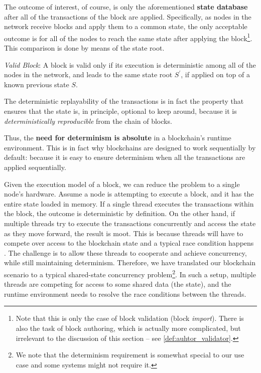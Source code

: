 The outcome of interest, of course, is only the aforementioned \textbf{state database} after all of
the transactions of the block are applied. Specifically, as nodes in the network receive blocks and
apply them to a common state, the only acceptable outcome is for all of the nodes to reach the same
state after applying the block\footnote{Note that this is only the case of block validation (block
\textit{import}). There is also the task of block authoring, which is actually more complicated, but
irrelevant to the discussion of this section -- see \ref{def:auhtor_validator}.}. This comparison is
done by means of the state root.

\begin{definition} \label{def:valid_block} \textit{Valid Block}: A block is valid only if its
	execution is deterministic among all of the nodes in the network, and leads to the same state
	root $S^{'}$, if applied on top of a known previous state $S$.
\end{definition}

\begin{remark}
	The deterministic replayability of the transactions is in fact the property that ensures that
	the state is, in principle, optional to keep around, because it is \textit{deterministically
	reproducible} from the chain of blocks.
\end{remark}

Thus, the \textbf{need for determinism is absolute} in a blockchain's runtime environment. This is
in fact why blockchains are designed to work sequentially by default: because it is easy to ensure
determinism when all the transactions are applied sequentially.

Given the execution model of a block, we can reduce the problem to a single node's hardware. Assume
a node is attempting to execute a block, and it has the entire state loaded in memory. If a single
thread executes the transactions within the block, the outcome is deterministic by definition. On
the other hand, if multiple threads try to execute the transactions concurrently and access the
state as they move forward, the result is moot. This is because threads will have to compete over
access to the blockchain state and a typical race condition happens \cite{14:00-17:00ISOIEC9899}.
The challenge is to allow these threads to cooperate and achieve concurrency, while still
maintaining determinism. Therefore, we have translated our blockchain scenario to a typical
shared-state concurrency problem\footnote{We note that the determinism requirement is somewhat
special to our use case and some systems might not require it.}. In such a setup, multiple threads
are competing for access to some shared data (the state), and the runtime environment needs to
resolve the race conditions between the threads.

